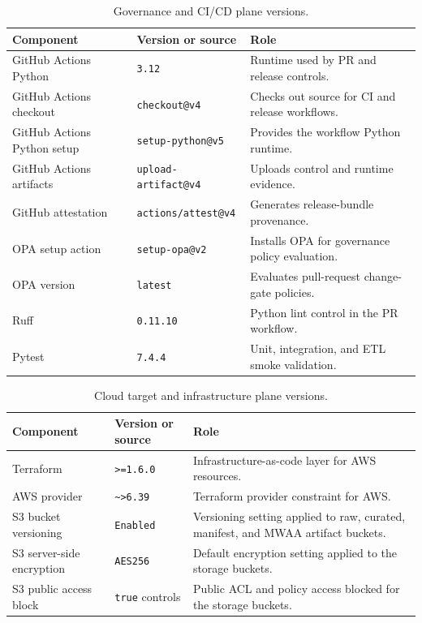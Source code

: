 \begin{table}[H]
  \centering
  \caption{Governance and CI/CD plane versions.}
  \label{tab:appendix-governance-plane}
  \renewcommand{\arraystretch}{1.12}
  \begin{tabularx}{\textwidth}{@{}p{}p{}X@{}}
    \toprule
    \textbf{Component} & \textbf{Version or source} & \textbf{Role} \\
    \midrule
    GitHub Actions Python & \texttt{3.12} & Runtime used by PR and release controls. \\
    GitHub Actions checkout & \texttt{checkout@v4} & Checks out source for CI and release workflows. \\
    GitHub Actions Python setup & \texttt{setup-python@v5} & Provides the workflow Python runtime. \\
    GitHub Actions artifacts & \texttt{upload-artifact@v4} & Uploads control and runtime evidence. \\
    GitHub attestation & \texttt{actions/attest@v4} & Generates release-bundle provenance. \\
    OPA setup action & \texttt{setup-opa@v2} & Installs OPA for governance policy evaluation. \\
    OPA version & \texttt{latest} & Evaluates pull-request change-gate policies. \\
    Ruff & \texttt{0.11.10} & Python lint control in the PR workflow. \\
    Pytest & \texttt{7.4.4} & Unit, integration, and ETL smoke validation. \\
    \bottomrule
  \end{tabularx}
\end{table}

\begin{table}[H]
  \centering
  \caption{Cloud target and infrastructure plane versions.}
  \label{tab:appendix-cloud-plane}
  \renewcommand{\arraystretch}{1.12}
  \begin{tabularx}{\textwidth}{@{}p{}p{}X@{}}
    \toprule
    \textbf{Component} & \textbf{Version or source} & \textbf{Role} \\
    \midrule
    Terraform & \texttt{>=1.6.0} & Infrastructure-as-code layer for AWS resources. \\
    AWS provider & \texttt{\textasciitilde{}>6.39} & Terraform provider constraint for AWS. \\
    S3 bucket versioning & \texttt{Enabled} & Versioning setting applied to raw, curated, manifest, and MWAA artifact buckets. \\
    S3 server-side encryption & \texttt{AES256} & Default encryption setting applied to the storage buckets. \\
    S3 public access block & \texttt{true} controls & Public ACL and policy access blocked for the storage buckets. \\
    \bottomrule
  \end{tabularx}
\end{table}

